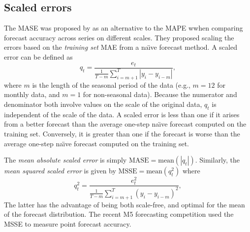 \documentclass[a4paper,10pt]{article}
\def\mean{\text{mean}}
\begin{document}
\subsection*{Scaled errors}

The MASE was proposed by \citet{HK06} as an alternative to the MAPE wwhen comparing forecast accuracy across series on different scales. They proposed scaling the errors based on the \emph{training set} MAE from a na\"{\i}ve forecast method. A scaled error can be defined as
\[
  q_t = \frac{e_t}{\displaystyle\frac{1}{T-m}\sum_{i=m+1}^T |y_i-y_{i-m}|},
\]
where $m$ is the length of the seasonal period of the data (e.g., $m=12$ for monthly data, and $m=1$ for non-seasonal data). Because the numerator and denominator both involve values on the scale of the original data, $q_t$ is independent of the scale of the data. A scaled error is less than one if it arises from a better forecast than the average one-step na\"{\i}ve forecast computed on the training set. Conversely, it is greater than one if the forecast is worse than the average one-step na\"{\i}ve forecast computed on the training set.

The \emph{mean absolute scaled error} is simply $\text{MASE} = \mean(|q_t|)$. Similarly, the \emph{mean squared scaled error} is given by $\text{MSSE} = \mean(q_t^2)$ where
$$
  q_t^2 = \frac{e_t^2}{\displaystyle\frac{1}{T-m}\sum_{i=m+1}^T (y_i-y_{i-m})^2},
$$
The latter has the advantage of being both scale-free, and optimal for the mean of the forecast distribution. The recent M5 forecasting competition used the MSSE \citep{M5accuracy} to measure point forecast accuracy.

\nocite{fpp3}


\end{document}

